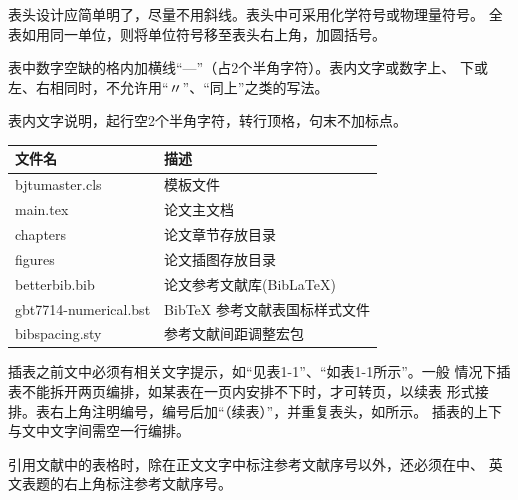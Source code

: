 表头设计应简单明了，尽量不用斜线。表头中可采用化学符号或物理量符号。 
全表如用同一单位，则将单位符号移至表头右上角，加圆括号。

表中数字空缺的格内加横线“—”（占2个半角字符）。表内文字或数字上、
下或左、右相同时，不允许用“〃”、“同上”之类的写法。 

表内文字说明，起行空2个半角字符，转行顶格，句末不加标点。

\begin{table}[H]\wuhao
  \centering
  \renewcommand\arraystretch{1.0} %
  \begin{tabular}{ll}
    \toprule
    文件名          & 描述                         \\
    \midrule
    bjtumaster.cls   & 模板文件                     \\
    main.tex & 论文主文档    \\
    chapters & 论文章节存放目录  \\
    figures & 论文插图存放目录        \\
    betterbib.bib & 论文参考文献库(BibLaTeX)        \\
    gbt7714-numerical.bst & BibTeX 参考文献表国标样式文件    \\
    bibspacing.sty & 参考文献间距调整宏包  \\
    \bottomrule
  \end{tabular}
  \label{tab:eg1}
\end{table}

插表之前文中必须有相关文字提示，如“见表1-1”、“如表1-1所示”。一般
情况下插表不能拆开两页编排，如某表在一页内安排不下时，才可转页，以续表
形式接排。表右上角注明编号，编号后加“（续表）”，并重复表头，如所示。
插表的上下与文中文字间需空一行编排。 

引用文献中的表格时，除在正文\cite{TUN2025LaTeXThesisTe}文字中标注参考文献序号以外，还必须在中、
英文表题的右上角标注参考文献序号。

